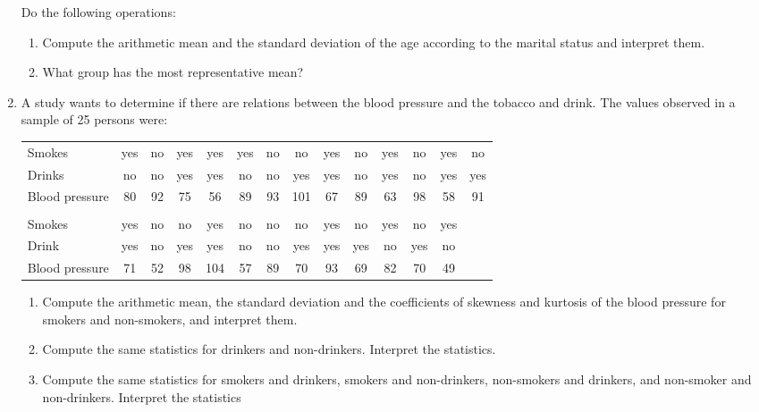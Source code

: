 \begin{enumerate}[leftmargin=*]
Do the following operations:
\begin{enumerate}
\item Compute the arithmetic mean and the standard deviation of the age according to the marital status and interpret
them.
\item What group has the most representative mean?
\end{enumerate}

\item A study wants to determine if there are relations between the blood pressure and the tobacco and drink. 
The values observed in a sample of 25 persons were:
\begin{center}
\begin{tabular}{lccccccccccccc}
\hline
Smokes  & yes & no & yes & yes & yes & no & no & yes & no & yes & no & yes & no \\
Drinks & no & no & yes & yes & no & no & yes & yes & no & yes & no & yes & yes \\
Blood pressure & 80 & 92 & 75 & 56 & 89 & 93 & 101 & 67 & 89 & 63 & 98 & 58 & 91 \\
\hline
\\
\hline
Smokes  & yes & no & no & yes & no & no & no & yes & no & yes & no & yes \\
Drink & yes & no & yes & yes & no & no & yes & yes & yes & no & yes & no \\
Blood pressure & 71 & 52 & 98 & 104 & 57 & 89 & 70 & 93 & 69 & 82 & 70 & 49 \\
\hline
\end{tabular}
\end{center}

\begin{enumerate}
\item Compute the arithmetic mean, the standard deviation and the coefficients of skewness and kurtosis of the blood
pressure for smokers and non-smokers, and interpret them.
\item Compute the same statistics for drinkers and non-drinkers. Interpret the statistics.
\item Compute the same statistics for smokers and drinkers, smokers and non-drinkers, non-smokers and drinkers, and
non-smoker and non-drinkers. Interpret the statistics
\end{enumerate}



\end{enumerate}
